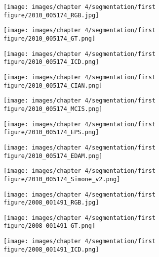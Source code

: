 \documentclass[runningheads]{styles/llncs}
\begin{document}
\begin{figure}[t]
\centering
\begin{subfigure}[b]{.11\linewidth}
\texttt{[image: images/chapter 4/segmentation/first figure/2010\_005174\_RGB.jpg]}
\end{subfigure}
\begin{subfigure}[b]{.11\linewidth}
\texttt{[image: images/chapter 4/segmentation/first figure/2010\_005174\_GT.png]}
\end{subfigure}
\begin{subfigure}[b]{.11\linewidth}
\texttt{[image: images/chapter 4/segmentation/first figure/2010\_005174\_ICD.png]}
\end{subfigure}
\begin{subfigure}[b]{.11\linewidth}
\texttt{[image: images/chapter 4/segmentation/first figure/2010\_005174\_CIAN.png]}
\end{subfigure}
\begin{subfigure}[b]{.11\linewidth}
\texttt{[image: images/chapter 4/segmentation/first figure/2010\_005174\_MCIS.png]}
\end{subfigure}
\begin{subfigure}[b]{.11\linewidth}
\texttt{[image: images/chapter 4/segmentation/first figure/2010\_005174\_EPS.png]}
\end{subfigure}
\begin{subfigure}[b]{.11\linewidth}
\texttt{[image: images/chapter 4/segmentation/first figure/2010\_005174\_EDAM.png]}
\end{subfigure}
\begin{subfigure}[b]{.11\linewidth}
\texttt{[image: images/chapter 4/segmentation/first figure/2010\_005174\_Simone\_v2.png]}
\end{subfigure}
\begin{subfigure}[b]{.11\linewidth}
\texttt{[image: images/chapter 4/segmentation/first figure/2008\_001491\_RGB.jpg]}
\end{subfigure}
\begin{subfigure}[b]{.11\linewidth}
\texttt{[image: images/chapter 4/segmentation/first figure/2008\_001491\_GT.png]}
\end{subfigure}
\begin{subfigure}[b]{.11\linewidth}
\texttt{[image: images/chapter 4/segmentation/first figure/2008\_001491\_ICD.png]}
\end{subfigure}

\end{figure}
\end{document}
